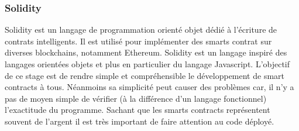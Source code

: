 \subsubsection{Solidity}

Solidity est un langage de programmation orienté objet dédié à l'écriture de contrats intelligents. Il est utilisé pour implémenter des smarts contrat sur diverses 
blockchains, notamment Ethereum. Solidity est un langage inspiré des langages orientées objets et plus en particulier du langage Javascript. L'objectif de ce stage est de rendre simple et
compréhensible le développement de smart contracts à tous. Néanmoins sa simplicité peut causer des problèmes car, il n'y a pas de moyen simple de vérifier (à la différence d'un langage fonctionnel)
l'exactitude du programme.  Sachant que les smarts contracts représentent souvent de l'argent il est très important de faire attention au code déployé.
